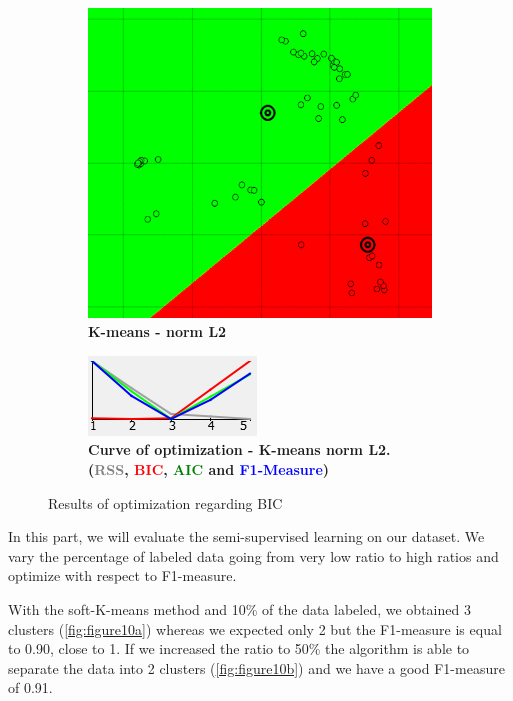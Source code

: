 \begin{figure} [h]
\begin{subfigure}[t]{0.25\textwidth}
    \includegraphics[height=0.15\textheight]{./clustering/opt_BIC_k_mean_L2_range5.png}
	\caption{\bf K-means - norm L2}
    \end{subfigure}
    \hspace{20mm}
    \begin{subfigure}[t]{0.50\textwidth}
    \centering
    \includegraphics[height=0.15\textheight]{./clustering/curve_opt_BIC_k_mean_L2_range5.png}
	\caption{\bf Curve of optimization - K-means norm L2. (\textcolor{gray}{RSS}, \textcolor{red}{BIC}, \textcolor{green}{AIC} and \textcolor{blue}{F1-Measure})}
    \end{subfigure}
\caption{Results of optimization regarding BIC}
\label{fig:figure9}
\end{figure}


In this part, we will evaluate the semi-supervised learning on our dataset. We vary the percentage of labeled data going from very low ratio to high ratios and optimize with respect to F1-measure.

With the soft-K-means method and 10\% of the data labeled, we obtained 3 clusters (\ref{fig:figure10a}) whereas we expected only 2 but the F1-measure is equal to 0.90, close to 1. If we increased the ratio to 50\% the algorithm is able to separate the data into 2 clusters (\ref{fig:figure10b}) and we have a good F1-measure of 0.91. 

